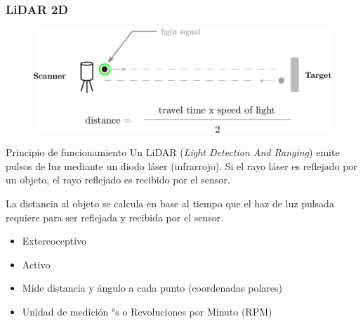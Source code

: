 \begin{frame}
    \frametitle{LiDAR 2D}
    
    \begin{figure}[!h]
        \centering
        \includegraphics[width=\columnwidth]{images/lidar_concept.pdf}
    \end{figure}
    \footnotesize
    \begin{block}{Principio de funcionamiento}
     Un LiDAR (\emph{Light Detection And Ranging}) emite pulsos de luz mediante un diodo láser (infrarrojo). Si el rayo láser es reflejado por un objeto, el rayo reflejado es recibido por el sensor.
     
     La distancia al objeto se calcula en base al tiempo que el haz de luz pulsada requiere para ser reflejada y recibida por el sensor.
    \end{block}
    
    \begin{itemize}
        \item Extereoceptivo
        \item Activo
        \item Mide distancia y ángulo a cada punto (coordenadas polares)
        \item Unidad de medición $\si{\degree\second}$ o Revoluciones por Minuto (RPM)
    \end{itemize}


\end{frame}

